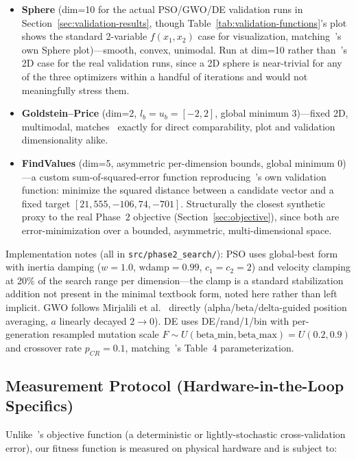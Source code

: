 \documentclass[journal]{IEEEtran}
\begin{document}
\begin{itemize}
  \item \textbf{Sphere} (dim=10 for the actual PSO/GWO/DE validation runs in Section~\ref{sec:validation-results}, though Table~\ref{tab:validation-functions}'s plot shows the standard 2-variable $f(x_1,x_2)$ case for visualization, matching~\cite{ref11}'s own Sphere plot)---smooth, convex, unimodal. Run at dim=10 rather than~\cite{ref11}'s 2D case for the real validation runs, since a 2D sphere is near-trivial for any of the three optimizers within a handful of iterations and would not meaningfully stress them.
  \item \textbf{Goldstein--Price} (dim=2, $l_b=u_b=[-2,2]$, global minimum 3)---fixed 2D, multimodal, matches~\cite{ref11} exactly for direct comparability, plot and validation dimensionality alike.
  \item \textbf{FindValues} (dim=5, asymmetric per-dimension bounds, global minimum 0)---a custom sum-of-squared-error function reproducing~\cite{ref11}'s own validation function: minimize the squared distance between a candidate vector and a fixed target $[21, 555, -106, 74, -701]$. Structurally the closest synthetic proxy to the real Phase~2 objective (Section~\ref{sec:objective}), since both are error-minimization over a bounded, asymmetric, multi-dimensional space.
\end{itemize}

Implementation notes (all in \texttt{src/phase2\_search/}): PSO uses global-best form with inertia damping ($w=1.0$, $\mathrm{wdamp}=0.99$, $c_1=c_2=2$) and velocity clamping at 20\% of the search range per dimension---the clamp is a standard stabilization addition not present in the minimal textbook form, noted here rather than left implicit. GWO follows Mirjalili et al.~\cite{ref9} directly (alpha/beta/delta-guided position averaging, $a$ linearly decayed $2\rightarrow0$). DE uses DE/rand/1/bin with per-generation resampled mutation scale $F\sim U(\mathrm{beta\_min},\mathrm{beta\_max}) = U(0.2,0.9)$ and crossover rate $p_{CR}=0.1$, matching~\cite{ref11}'s Table~4 parameterization.

\subsection{Measurement Protocol (Hardware-in-the-Loop Specifics)}
\label{sec:measurement-protocol}

Unlike~\cite{ref11}'s objective function (a deterministic or lightly-stochastic cross-validation error), our fitness function is measured on physical hardware and is subject to:
\end{document}
